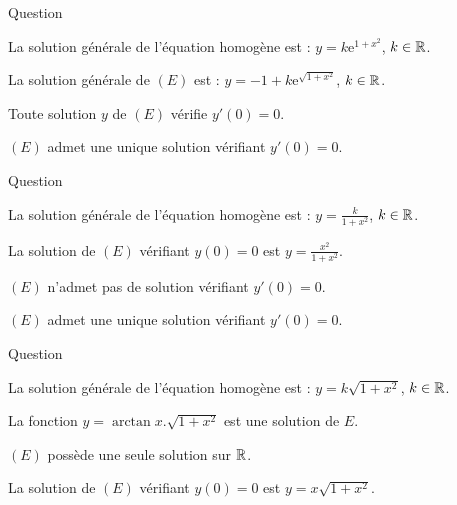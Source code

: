 \begin{multi}[multiple,feedback=
{La solution générale de l'équation homogène est \(\displaystyle Y=k\mathrm{e}^{\sqrt{1+x^2}}\), \(k\in \Rr\), et \(y_0=-1\) est une solution particulière. En posant \(x=0\) dans \((E)\), on obtient \(y'(0)=0\), donc toute solution de \((E)\) vérifie \(y'(0)=0\).
}]{Question}
    \item La solution générale de l'équation homogène est : \(\displaystyle y=k\mathrm{e}^{1+x^2}\), \(k\in \Rr\).
    \item* La solution générale de \((E)\) est : \(\displaystyle y=-1+k\mathrm{e}^{\sqrt{1+x^2}}\), \(k\in \Rr\).
    \item* Toute solution \(y\) de \((E)\) vérifie \(y'(0)=0\).
    \item \((E)\) admet une unique solution vérifiant \(y'(0)=0\).
\end{multi}


\begin{multi}[multiple,feedback=
{La solution générale de l'équation homogène est : \(\displaystyle Y=\frac{k}{1+x^2}\), \(k\in \Rr\), et \(y_0=1\) est une solution particulière. La solution générale de \((E)\) est :
\[y=1+\frac{k}{1+x^2},\quad k\in \Rr.\]
La condition \(y(0)=0\) donne \(k=-1\). Par ailleurs, en posant \(x=0\) dans \((E)\), on obtient \(y'(0)=0\). Donc toute solution de \((E)\) vérifient la condition \(y'(0)=0\).
}]{Question}
    \item* La solution générale de l'équation homogène est : \(\displaystyle y=\frac{k}{1+x^2}\), \(k\in \Rr\).
    \item* La solution de \((E)\) vérifiant \(y(0)=0\) est \(\displaystyle y=\frac{x^2}{1+x^2}\).
    \item \((E)\) n'admet pas de solution vérifiant \(y'(0)=0\).
    \item \((E)\) admet une unique solution vérifiant \(y'(0)=0\).
\end{multi}


\begin{multi}[multiple,feedback=
{La solution générale de \((E)\) est \(y=(k+\arctan x)\sqrt{1+x^2}\), \(k\in \Rr\). Celle vérifiant \(y(0)=0\) est \(y=\arctan x.\sqrt{1+x^2}\).
}]{Question}
    \item* La solution générale de l'équation homogène est : \(y=k\sqrt{1+x^2}\), \(k\in \Rr\).
    \item* La fonction \(y=\arctan x.\sqrt{1+x^2}\) est une solution de \(E\).
    \item \((E)\) possède une seule solution sur \(\mathbb{R}\).
    \item La solution de \((E)\) vérifiant \(y(0)=0\) est \(y=x\sqrt{1+x^2}\).
\end{multi}


